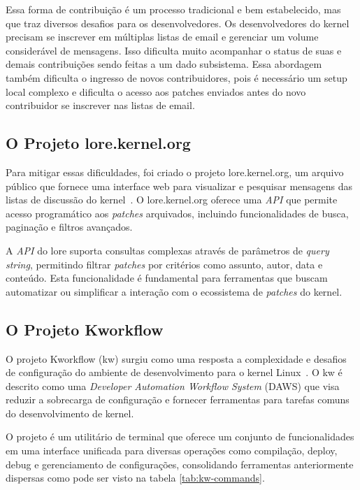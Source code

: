 Essa forma de contribuição é um processo tradicional e bem estabelecido, mas que traz diversos desafios para os desenvolvedores. Os desenvolvedores do kernel precisam se inscrever em múltiplas listas de email e gerenciar um volume considerável de mensagens. Isso dificulta muito acompanhar o status de suas e demais contribuições sendo feitas a um dado subsistema. Essa abordagem também dificulta o ingresso de novos contribuidores, pois é necessário um setup local complexo e dificulta o acesso aos patches enviados antes do novo contribuidor se inscrever nas listas de email.

\subsection{O Projeto lore.kernel.org}

Para mitigar essas dificuldades, foi criado o projeto lore.kernel.org, um arquivo público que fornece uma interface web para visualizar e pesquisar mensagens das listas de discussão do kernel~\citep{lore_api}. O lore.kernel.org oferece uma \emph{API} que permite acesso programático aos \emph{patches} arquivados, incluindo funcionalidades de busca, paginação e filtros avançados.

A \emph{API} do lore suporta consultas complexas através de parâmetros de \emph{query string}, permitindo filtrar \emph{patches} por critérios como assunto, autor, data e conteúdo. Esta funcionalidade é fundamental para ferramentas que buscam automatizar ou simplificar a interação com o ecossistema de \emph{patches} do kernel.

\subsection{O Projeto Kworkflow}

O projeto Kworkflow (kw) surgiu como uma resposta a complexidade e desafios de configuração do ambiente de desenvolvimento para o kernel Linux~\citep{tadokoro2025kworkflow}. O kw é descrito como uma \textit{Developer Automation Workflow System} (DAWS) que visa reduzir a sobrecarga de configuração e fornecer ferramentas para tarefas comuns do desenvolvimento de kernel.

O projeto é um utilitário de terminal que oferece um conjunto de funcionalidades em uma interface unificada para diversas operações como compilação, deploy, debug e gerenciamento de configurações, consolidando ferramentas anteriormente dispersas como pode ser visto na tabela \ref{tab:kw-commands}.

